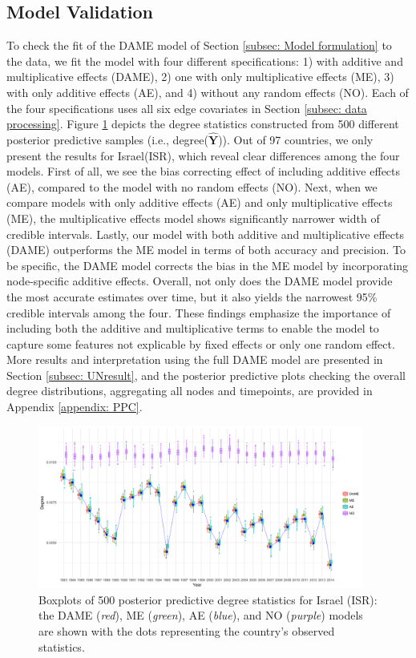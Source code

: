 \documentclass[a4paper]{article}
\begin{document}
\subsection{Model Validation}\label{subsec: Model Validation}
To check the fit of the DAME model of Section \ref{subsec: Model formulation} to the data, we fit the model with four different specifications: 1) with additive and multiplicative effects (DAME), 2) one with only multiplicative effects (ME), 3) with only additive effects (AE), and 4) without any random effects (NO). Each of the four specifications uses all six edge covariates in Section \ref{subsec: data processing}. Figure \ref{figure:modelvalidation} depicts the degree statistics constructed from 500 different posterior predictive samples (i.e., degree($\hat{\mathbf{Y}}$)). Out of 97 countries, we only present the results for Israel(ISR), which reveal clear differences among the four models. First of all, we see the bias correcting effect of including additive effects (AE), compared to the model with no random effects (NO). Next, when we compare models with only additive effects (AE) and only multiplicative effects (ME), the multiplicative effects model shows significantly narrower width of credible intervals. Lastly, our model with both additive and multiplicative effects (DAME) outperforms the ME model in terms of both accuracy and precision. To be specific, the DAME model corrects the bias in the ME model by incorporating node-specific additive effects. Overall, not only does the DAME model provide the most accurate estimates over time, but it also yields the narrowest 95\% credible intervals among the four. These findings emphasize the importance of including both the additive and multiplicative terms to enable the model to capture some features not explicable by fixed effects or only one random effect. More results and interpretation using the full DAME model are presented in Section \ref{subsec: UNresult}, and the posterior predictive plots checking the overall degree distributions, aggregating all nodes and timepoints, are provided in Appendix \ref{appendix: PPC}.
 \begin{figure}[!ht]
 	\begin{center}
 		\includegraphics[width=0.955\textwidth]{plots_paper/ISR79.png}	
 	\end{center}
 	\caption {Boxplots of 500 posterior predictive degree statistics for Israel (ISR): the DAME (\textit{red}), ME (\textit{green}), AE (\textit{blue}), and NO (\textit{purple}) models are shown with the dots representing the country's observed statistics.}
 	\label{figure:modelvalidation}
 \end{figure}
 
\end{document}

